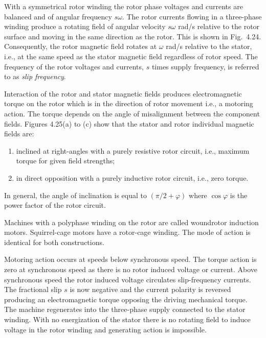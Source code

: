 \documentclass[a4paper,numbers=noenddot,12pt]{scrbook}
\begin{document}
            With a symmetrical rotor winding the rotor phase voltages and currents are balanced and of angular frequency $s \omega$. The rotor currents flowing in a three-phase winding produce a rotating field of angular velocity $s \omega$ rad/s relative to the rotor surface and moving in the same direction as the rotor. This is shown in Fig.\ 4.24. Consequently, the rotor magnetic field rotates at $\omega$ rad/s relative to the stator, i.e., at the same speed as the stator magnetic field regardless of
            rotor speed. The frequency of the rotor voltages and currents, $s$ times supply frequency, is referred to as \textit{slip frequency}.

            Interaction of the rotor and stator magnetic fields produces electromagnetic torque on the rotor which is in the direction of rotor movement i.e., a motoring action. The torque depends on the angle of misalignment between the component fields. Figures 4.25(a) to (c) show that the stator and rotor individual magnetic fields are: 
            \begin{enumerate}
                \item inclined at right-angles with a purely resistive rotor circuit, i.e., maximum torque for given field strengths; 
                \item in direct opposition with a purely inductive rotor circuit, i.e., zero torque. 
            \end{enumerate}

            In general, the angle of inclination is equal to $(\pi/2 + \varphi)$ where $\cos \varphi$ is the power factor of the rotor circuit.

            Machines with a polyphase winding on the rotor are called wound­rotor induction motors. Squirrel-cage motors have a rotor-cage winding. The mode of action is identical for both constructions.

            Motoring action occurs at speeds below synchronous speed. The torque action is zero at synchronous speed as there is no rotor induced voltage or current. Above synchronous speed the rotor induced voltage circulates slip-frequency currents. The fractional slip $s$ is now negative and the current polarity is reversed producing an electromagnetic torque opposing the driving mechanical torque. The machine regenerates into the three-phase supply connected to the stator winding. With no energization of the stator there is no rotating field to induce voltage in the rotor winding and generating action is impossible.
\end{document}
